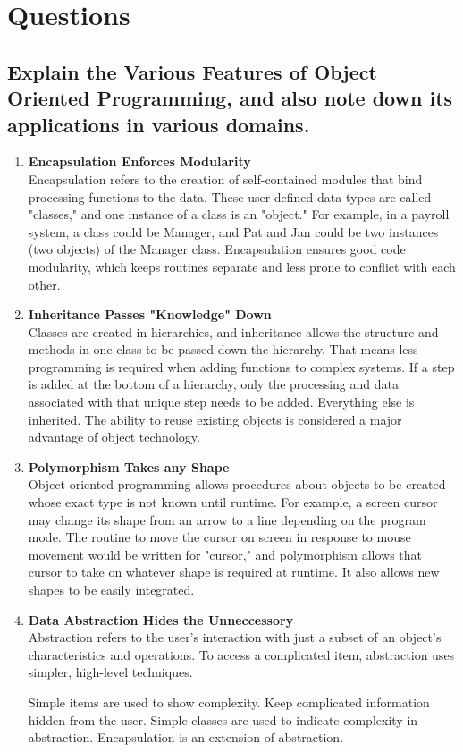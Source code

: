 \documentclass[11pt]{article}
\begin{document}
\thispagestyle{empty}
\clearpage


\setcounter{page}{1}

\section{Questions}
\subsection{Explain the Various Features of Object Oriented Programming, and also note down its applications in various domains.}

\begin{enumerate}
	\item \textbf{Encapsulation Enforces Modularity}\\
	Encapsulation refers to the creation of self-contained modules that bind processing functions to the data. These user-defined data types are called "classes," and one instance of a class is an "object." For example, in a payroll system, a class could be Manager, and Pat and Jan could be two instances (two objects) of the Manager class. Encapsulation ensures good code modularity, which keeps routines separate and less prone to conflict with each other.

	\item \textbf{Inheritance Passes "Knowledge" Down}\\
	Classes are created in hierarchies, and inheritance allows the structure and methods in one class to be passed down the hierarchy. That means less programming is required when adding functions to complex systems. If a step is added at the bottom of a hierarchy, only the processing and data associated with that unique step needs to be added. Everything else is inherited. The ability to reuse existing objects is considered a major advantage of object technology.

	\item \textbf{Polymorphism Takes any Shape}\\
	Object-oriented programming allows procedures about objects to be created whose exact type is not known until runtime. For example, a screen cursor may change its shape from an arrow to a line depending on the program mode. The routine to move the cursor on screen in response to mouse movement would be written for "cursor," and polymorphism allows that cursor to take on whatever shape is required at runtime. It also allows new shapes to be easily integrated.

	\item \textbf{Data Abstraction Hides the Unneccessory}\\
	Abstraction refers to the user's interaction with just a subset of an object's characteristics and operations. To access a complicated item, abstraction uses simpler, high-level techniques.

	Simple items are used to show complexity.
	Keep complicated information hidden from the user.
	Simple classes are used to indicate complexity in abstraction. Encapsulation is an extension of abstraction. 

\end{enumerate}
\end{document}
